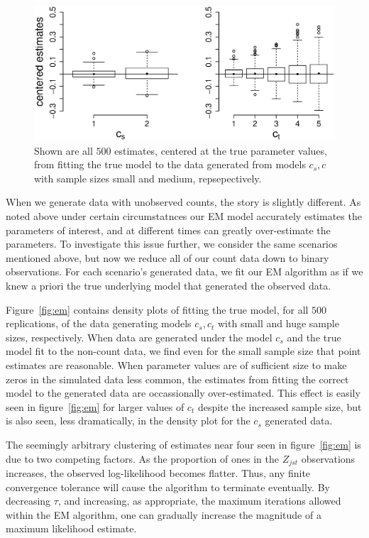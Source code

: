 \begin{figure}
  \centering
  \includegraphics[scale=0.5]{bp}
  \caption{Shown are all $500$ estimates, centered at the true parameter values, from fitting the true model to the data generated from models $c_s,c$ with sample sizes small and medium, repsepectively.}
  \label{fig:bp}
\end{figure}

When we generate data with unobserved counts, the story is slightly different.  As noted above under certain circumstatnces our EM model accurately estimates the parameters of interest, and at different times can greatly over-estimate the parameters.  To investigate this issue further, we consider the same scenarios mentioned above, but now we reduce all of our count data down to binary observations.  For each scenario's generated data, we fit our EM algorithm as if we knew a priori the true underlying model that generated the observed data.

Figure~\ref{fig:em} contains density plots of fitting the true model, for all $500$ replications, of the data generating models $c_s,c_t$ with small and huge sample sizes, respectively.  When data are generated under the model $c_s$ and the true model fit to the non-count data, we find even for the small sample size that point estimates are reasonable.  When parameter values are of sufficient size to make zeros in the simulated data less common, the estimates from fitting the correct model to the generated data are occassionally over-estimated.  This effect is easily seen in figure~\ref{fig:em} for larger values of $c_t$ despite the increased sample size, but is also seen, less dramatically, in the density plot for the $c_s$ generated data.  

The seemingly arbitrary clustering of estimates near four seen in figure~\ref{fig:em} is due to two competing factors.  As the proportion of ones in the $Z_{jst}$ observations increases, the observed log-likelihood becomes flatter.  Thus, any finite convergence tolerance will cause the algorithm to terminate eventually.  By decreasing $\tau$, and increasing, as appropriate, the maximum iterations allowed within the EM algorithm, one can gradually increase the magnitude of a maximum likelihood estimate.


